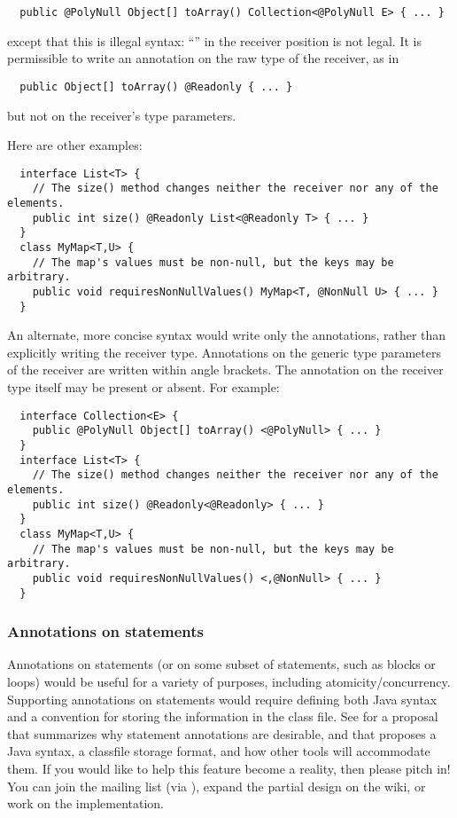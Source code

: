 \documentclass[10pt]{article}
\begin{document}
\begin{Verbatim}
  public @PolyNull Object[] toArray() Collection<@PolyNull E> { ... }
\end{Verbatim}

\noindent
except that this is illegal syntax:  ``'' in
the receiver position is not legal.  It is permissible to write an
annotation on the raw type of the receiver, as in

\begin{Verbatim}
  public Object[] toArray() @Readonly { ... }
\end{Verbatim}

\noindent
but not on the receiver's type parameters.

Here are other examples:

\begin{Verbatim}
  interface List<T> {
    // The size() method changes neither the receiver nor any of the elements.
    public int size() @Readonly List<@Readonly T> { ... }
  }
  class MyMap<T,U> {
    // The map's values must be non-null, but the keys may be arbitrary.
    public void requiresNonNullValues() MyMap<T, @NonNull U> { ... }
  }
\end{Verbatim}

An alternate, more concise syntax would write only the annotations, rather
than explicitly writing the receiver type.  Annotations on the generic type
parameters of the receiver are written within angle brackets.  The
annotation on the receiver type itself may be present or absent.  For
example:

\begin{Verbatim}
  interface Collection<E> {
    public @PolyNull Object[] toArray() <@PolyNull> { ... }
  }
  interface List<T> {
    // The size() method changes neither the receiver nor any of the elements.
    public int size() @Readonly<@Readonly> { ... }
  }
  class MyMap<T,U> {
    // The map's values must be non-null, but the keys may be arbitrary.
    public void requiresNonNullValues() <,@NonNull> { ... }
  }
\end{Verbatim}


\subsubsection{Annotations on statements\label{statement-annotations}}

Annotations on statements (or on some subset of statements, such as blocks
or loops) would be useful for a variety of purposes, including
atomicity/concurrency.  Supporting annotations on statements would require
defining both Java syntax and a convention for storing the information in
the class file.  See
 for a
proposal that summarizes why statement annotations are desirable, and that
proposes a Java syntax, a classfile storage format, and how other tools
will accommodate them.  If you would like to help this feature become a
reality, then please pitch in!  You can join the
 mailing list (via
),
expand the partial design on the wiki, or work on the implementation.
\end{document}
